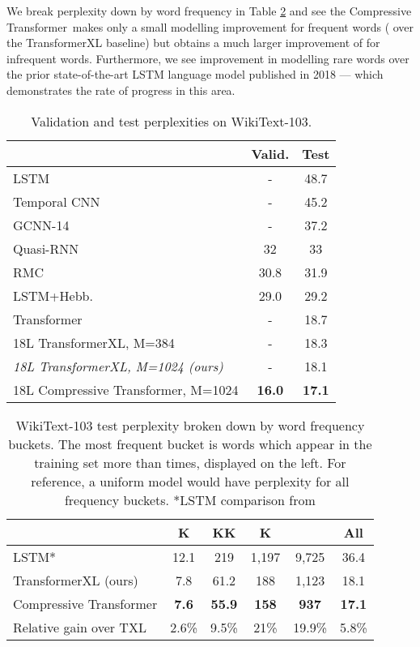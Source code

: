 \documentclass{article} \usepackage{iclr2020_conference,times}
\newcommand{\model}{Compressive Transformer}
\begin{document}
We break perplexity down by word frequency in Table \ref{tab:lm_breakdown} and see the \model~makes only a small modelling improvement for frequent words ( over the TransformerXL baseline) but obtains a much larger improvement of  for infrequent words. Furthermore, we see  improvement in modelling rare words over the prior state-of-the-art LSTM language model published in 2018 --- which demonstrates the rate of progress in this area.
\begin{table}[]
    \footnotesize
    \centering
    \caption{\footnotesize Validation and test perplexities on WikiText-103.}
    \begin{tabular}{lc c}
    \toprule
    & Valid. & Test \\
    \midrule
    LSTM \citep{graves2014neural} & - & 48.7 \\
    Temporal CNN \citep{bai2018convolutional} & - & 45.2 \\
    GCNN-14 \citep{dauphin2016language} & - & 37.2 \\ 
    Quasi-RNN \cite{bradbury2016quasi} & 32 & 33 \\
    RMC \citep{santoro2018relational} & 30.8 & 31.9 \\
    LSTM+Hebb. \citep{rae2018fast} & 29.0 & 29.2 \\
    Transformer \citep{baevski2019adaptive} & - & 18.7 \\
    18L TransformerXL, M=384 \citep{dai2019transformer} & - & 18.3 \\
    \midrule
    \textit{18L TransformerXL, M=1024 (ours)} & - & 18.1 \\ 
    18L \model, M=1024 & \textbf{16.0} & \textbf{17.1} \\
    \bottomrule
    \end{tabular}
    \label{tab:wiki}
\end{table}
\begin{table}
    \small
    \centering
    \caption{WikiText-103 test perplexity broken down by word frequency buckets. The most frequent bucket is words which appear in the training set more than  times, displayed on the left. For reference, a uniform model would have perplexity  for all frequency buckets. *LSTM comparison from \citet{rae2018fast}}
    \begin{tabular}{l c c c c c}
    \toprule
     & K & KK & K &  & All \\ 
     \midrule
    LSTM* & 12.1 & 219 & 1,197 & 9,725 & 36.4 \\
    TransformerXL (ours) & 7.8	& 61.2 & 188 &	1,123 &	18.1 \\
    \model & \textbf{7.6} &	\textbf{55.9} & \textbf{158}	& \textbf{937} & \textbf{17.1} \\
    \midrule 
    Relative gain over TXL & 2.6\% & 9.5\% & 21\% & 19.9\% & 5.8\% \\
    \bottomrule
    \end{tabular}
    \label{tab:lm_breakdown}
\end{table}
\vspace{-1.0em}
\end{document}
